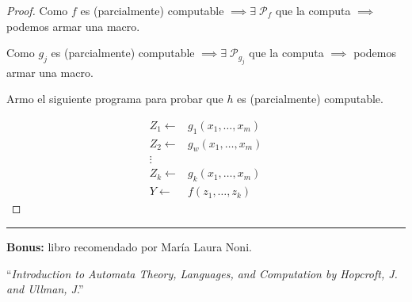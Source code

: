 \begin{proof} \phantom{.}

    Como $f$ es (parcialmente) computable 
    $\implies \exists \; \mathcal{P}_f$ que
    la computa $\implies$ podemos armar una macro.

    Como $g_j$ es (parcialmente) computable 
    $\implies \exists \; \mathcal{P}_{g_j}$ 
    que la computa $\implies$ podemos armar una macro.

    Armo el siguiente programa para probar que $h$ es (parcialmente) 
    computable.

    \begin{align*}
        Z_1 \gets& g_1 (x_1, \dotsc, x_m) \\
        Z_2 \gets& g_w (x_1, \dotsc, x_m) \\
        \vdots & \\
        Z_k \gets& g_k (x_1, \dotsc, x_m) \\
        Y \gets& f(z_1, \dotsc, z_k)
    \end{align*}
\end{proof}

\medskip

\noindent\rule{\textwidth}{0.25pt}

\medskip

\textbf{Bonus:} libro recomendado por María Laura Noni.

``\textit{Introduction to Automata Theory, Languages, and Computation by 
Hopcroft, J. and Ullman, J}.''

